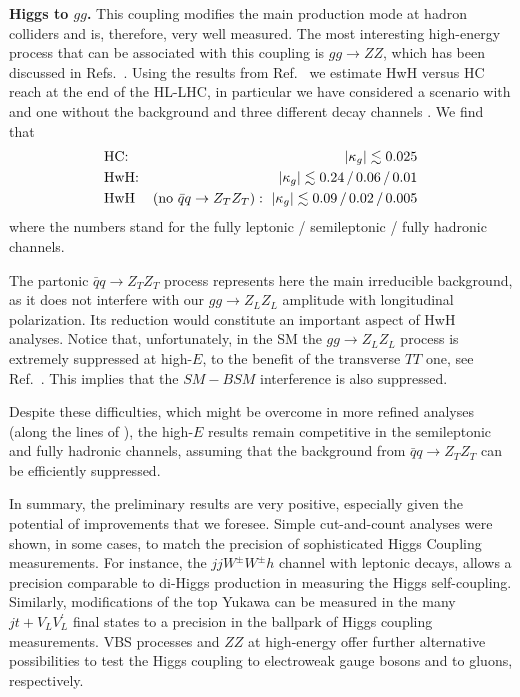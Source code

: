 \vspace{5mm}
\noindent
{\bf Higgs to $gg$.}
This coupling modifies the main production mode at hadron colliders and is, therefore, very well measured. 
The most interesting high-energy process that can be associated with this coupling is $gg\to ZZ$, which has  been discussed in Refs.~\cite{Azatov:2014jga,Cacciapaglia:2014rla,Azatov:2016xik}. 
Using the results from Ref.~\cite{Azatov:2014jga} we estimate HwH versus HC reach at the end of the HL-LHC, in particular we have considered a scenario with and one without the background and three different decay channels . We find that 
\begin{eqnarray}
&\textrm{HC:}\,\,\,\, & |\kappa_g|\lesssim 0.025\nonumber\\
&\textrm{HwH:}&|\kappa_g| \lesssim 0.24\, /\, 0.06 \, /\, 0.01\\
&\textrm{HwH}&(\textrm{no }\bar qq\to Z_TZ_T):\,\, |\kappa_g| \lesssim 0.09  \, /\, 0.02  \, /\, 0.005\nonumber
\end{eqnarray}
where the numbers stand for the fully leptonic / semileptonic / fully hadronic channels.

The partonic $\bar qq\to Z_TZ_T$ process represents here the main irreducible background, as it does not interfere with our $gg\to Z_LZ_L$  amplitude with longitudinal polarization. Its reduction would constitute an important aspect of HwH analyses. Notice that, unfortunately, in the SM  the $gg\to Z_LZ_L$ process is extremely suppressed at high-$E$, to the benefit of the transverse $TT$ one, see Ref.~\cite{Glover:1988rg}.  This implies that the $SM-BSM$ interference is also suppressed.

Despite these difficulties, which might be overcome in more refined analyses (along the lines of \cite{Panico:2017frx,Azatov:2017kzw}), the high-$E$ results remain competitive  in the semileptonic and fully hadronic channels, assuming that the background from $\bar qq\to Z_TZ_T$ can be efficiently suppressed. 

\vspace{1cm}

In summary, the preliminary results are very positive,
 especially given the potential of improvements that we foresee.  
Simple cut-and-count analyses were shown, in some cases, to match the precision of sophisticated Higgs Coupling measurements.
For instance, the $jjW^\pm W^\pm h$  channel with leptonic decays, allows a precision comparable to di-Higgs production in measuring the Higgs self-coupling. Similarly, modifications of the top Yukawa can be measured in  the many $j t+ V_LV^\prime_L$ final states to a precision in the ballpark of Higgs coupling measurements.
VBS processes and $ZZ$ at high-energy offer further alternative possibilities to test the Higgs coupling to electroweak gauge bosons and to gluons, respectively.

